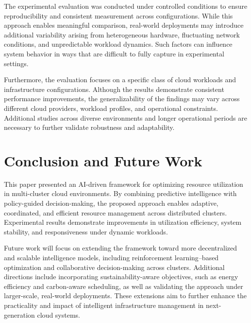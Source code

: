 \documentclass[conference]{IEEEtran}
\begin{document}
The experimental evaluation was conducted under controlled conditions to ensure reproducibility and consistent measurement across configurations. While this approach enables meaningful comparison, real-world deployments may introduce additional variability arising from heterogeneous hardware, fluctuating network conditions, and unpredictable workload dynamics. Such factors can influence system behavior in ways that are difficult to fully capture in experimental settings.

Furthermore, the evaluation focuses on a specific class of cloud workloads and infrastructure configurations. Although the results demonstrate consistent performance improvements, the generalizability of the findings may vary across different cloud providers, workload profiles, and operational constraints. Additional studies across diverse environments and longer operational periods are necessary to further validate robustness and adaptability.

\section{Conclusion and Future Work}

This paper presented an AI-driven framework for optimizing resource utilization in multi-cluster cloud environments. By combining predictive intelligence with policy-guided decision-making, the proposed approach enables adaptive, coordinated, and efficient resource management across distributed clusters. Experimental results demonstrate improvements in utilization efficiency, system stability, and responsiveness under dynamic workloads.

Future work will focus on extending the framework toward more decentralized and scalable intelligence models, including reinforcement learning–based optimization and collaborative decision-making across clusters. Additional directions include incorporating sustainability-aware objectives, such as energy efficiency and carbon-aware scheduling, as well as validating the approach under larger-scale, real-world deployments. These extensions aim to further enhance the practicality and impact of intelligent infrastructure management in next-generation cloud systems.
\end{document}
